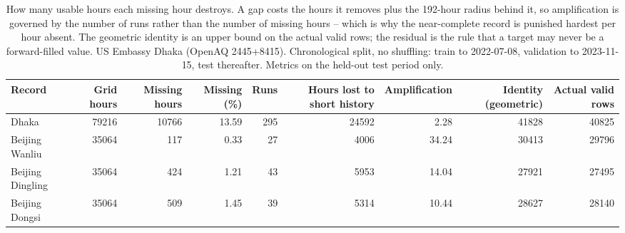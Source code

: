 \begin{table}[htbp]
\caption{How many usable hours each missing hour destroys. A gap costs the hours it removes plus the 192-hour radius behind it, so amplification is governed by the number of runs rather than the number of missing hours -- which is why the near-complete record is punished hardest per hour absent. The geometric identity is an upper bound on the actual valid rows; the residual is the rule that a target may never be a forward-filled value. US Embassy Dhaka (OpenAQ 2445+8415). Chronological split, no shuffling: train to 2022-07-08, validation to 2023-11-15, test thereafter. Metrics on the held-out test period only.}
\label{tab:amplification_by_record}
\begin{tabular}{lrrrrrrrr}
\toprule
Record & Grid hours & Missing hours & Missing (\%) & Runs & Hours lost to short history & Amplification & Identity (geometric) & Actual valid rows \\
\midrule
Dhaka & 79216 & 10766 & 13.59 & 295 & 24592 & 2.28 & 41828 & 40825 \\
Beijing Wanliu & 35064 & 117 & 0.33 & 27 & 4006 & 34.24 & 30413 & 29796 \\
Beijing Dingling & 35064 & 424 & 1.21 & 43 & 5953 & 14.04 & 27921 & 27495 \\
Beijing Dongsi & 35064 & 509 & 1.45 & 39 & 5314 & 10.44 & 28627 & 28140 \\
\bottomrule
\end{tabular}
\end{table}
